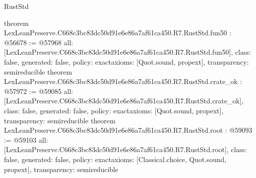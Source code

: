 \begin{lexlean}{RustStd}
\begin{coremodule}
{}
theorem LexLeanPreserve.C668c3bc83dc50d91e6e86a7af61ca450.R7.RustStd.fun50 : @56678 := @57968 {
  all: [LexLeanPreserve.C668c3bc83dc50d91e6e86a7af61ca450.R7.RustStd.fun50],
  class: false,
  generated: false,
  policy: exact{axioms: [Quot.sound, propext]},
  transparency: semireducible
}
theorem LexLeanPreserve.C668c3bc83dc50d91e6e86a7af61ca450.R7.RustStd.crate_ok : @57972 := @59085 {
  all: [LexLeanPreserve.C668c3bc83dc50d91e6e86a7af61ca450.R7.RustStd.crate_ok],
  class: false,
  generated: false,
  policy: exact{axioms: [Quot.sound, propext]},
  transparency: semireducible
}
theorem LexLeanPreserve.C668c3bc83dc50d91e6e86a7af61ca450.R7.RustStd.root : @59093 := @59103 {
  all: [LexLeanPreserve.C668c3bc83dc50d91e6e86a7af61ca450.R7.RustStd.root],
  class: false,
  generated: false,
  policy: exact{axioms: [Classical.choice, Quot.sound, propext]},
  transparency: semireducible
}


\end{coremodule}
\end{lexlean}
